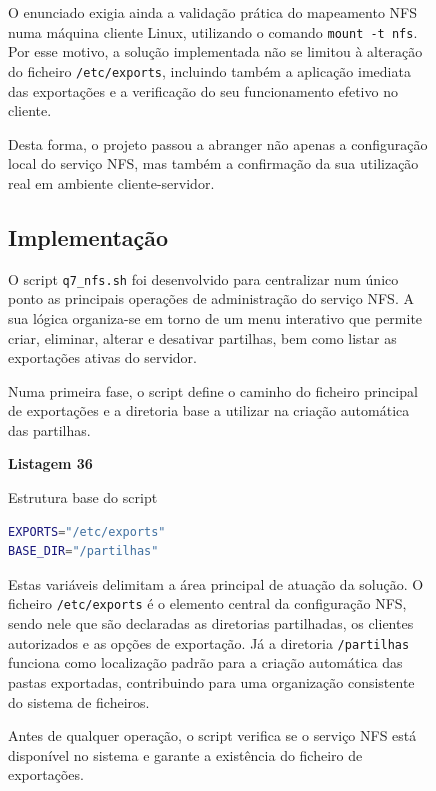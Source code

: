 \begin{figure}[H]
O enunciado exigia ainda a valida\c{c}\~ao pr\'atica do mapeamento NFS numa m\'aquina cliente Linux, utilizando o comando \texttt{mount -t nfs}. Por esse motivo, a solu\c{c}\~ao implementada n\~ao se limitou \`a altera\c{c}\~ao do ficheiro \texttt{/etc/exports}, incluindo tamb\'em a aplica\c{c}\~ao imediata das exporta\c{c}\~oes e a verifica\c{c}\~ao do seu funcionamento efetivo no cliente.

Desta forma, o projeto passou a abranger n\~ao apenas a configura\c{c}\~ao local do servi\c{c}o NFS, mas tamb\'em a confirma\c{c}\~ao da sua utiliza\c{c}\~ao real em ambiente cliente-servidor.

\subsection{Implementa\c{c}\~ao}

O script \texttt{q7\_nfs.sh} foi desenvolvido para centralizar num \'unico ponto as principais opera\c{c}\~oes de administra\c{c}\~ao do servi\c{c}o NFS. A sua l\'ogica organiza-se em torno de um menu interativo que permite criar, eliminar, alterar e desativar partilhas, bem como listar as exporta\c{c}\~oes ativas do servidor.

Numa primeira fase, o script define o caminho do ficheiro principal de exporta\c{c}\~oes e a diretoria base a utilizar na cria\c{c}\~ao autom\'atica das partilhas.

\textbf{Listagem 36}

Estrutura base do script

\begin{lstlisting}[language=bash,breaklines=true,basicstyle=\ttfamily\small,columns=fullflexible,keepspaces=true,showstringspaces=false]
EXPORTS="/etc/exports"
BASE_DIR="/partilhas"
\end{lstlisting}

Estas vari\'aveis delimitam a \'area principal de atua\c{c}\~ao da solu\c{c}\~ao. O ficheiro \texttt{/etc/exports} \'e o elemento central da configura\c{c}\~ao NFS, sendo nele que s\~ao declaradas as diretorias partilhadas, os clientes autorizados e as op\c{c}\~oes de exporta\c{c}\~ao. J\'a a diretoria \texttt{/partilhas} funciona como localiza\c{c}\~ao padr\~ao para a cria\c{c}\~ao autom\'atica das pastas exportadas, contribuindo para uma organiza\c{c}\~ao consistente do sistema de ficheiros.

Antes de qualquer opera\c{c}\~ao, o script verifica se o servi\c{c}o NFS est\'a dispon\'ivel no sistema e garante a exist\^encia do ficheiro de exporta\c{c}\~oes.


\end{figure}
